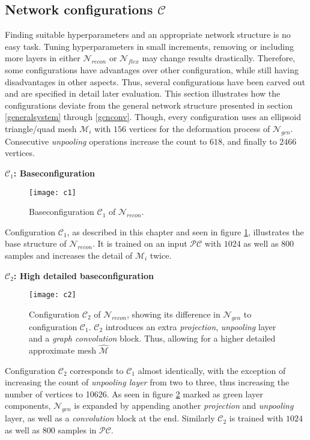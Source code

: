 \subsection{Network configurations $\mathcal{C}$}
\label{configurations}
Finding suitable hyperparameters and an appropriate network structure 
is no easy task. Tuning hyperparameters in small increments, removing or including 
more layers in either $\mathcal{N}_{recon}$ or $\mathcal{N}_{flex}$ may change results drastically.
 Therefore, some configurations have advantages over other 
configuration, while still having disadvantages in other aspects.
Thus, several configurations have been carved out and are specified 
in detail later evaluation. This section illustrates how the configurations deviate from the general
 network structure presented in section \ref{generalsystem} through \ref{gcnconv}.
Though, every configuration uses an ellipsoid triangle/quad mesh $\mathcal{M}_{i}$ with $156$ vertices for the deformation process of $\mathcal{N}_{gcn}$.
Consecutive \emph{unpooling} operations increase the count to $618$, and finally to $2466$ vertices.

\textbf{$\mathcal{C}_1$: Baseconfiguration}
\begin{figure}
   \begin{center}
   \texttt{[image: c1]}
   \caption{Baseconfiguration $\mathcal{C}_1$ of $\mathcal{N}_{recon}$.}
   \label{fig:c1}
   \end{center}
\end{figure}
Configuration $\mathcal{C}_1$, as described in this chapter and seen in figure \ref{fig:c1},
 illustrates the base structure of $\mathcal{N}_{recon}$.
It is trained on an input $\mathcal{PC}$ with $1024$ as well as $800$ samples and increases
 the detail of $\mathcal{M}_{i}$ twice. 

\textbf{$\mathcal{C}_2$: High detailed baseconfiguration}
\begin{figure}
   \begin{center}
   \texttt{[image: c2]}
   \caption{Configuration $\mathcal{C}_2$ of $\mathcal{N}_{recon}$, showing its difference in $\mathcal{N}_{gcn}$ to configuration $\mathcal{C}_1$.
   $\mathcal{C}_2$ introduces an extra \emph{projection}, \emph{unpooling} layer and a \emph{graph convolution} block. Thus, allowing for a higher detailed approximate mesh $\hat{\mathcal{M}}$ }
   \label{fig:c2}
   \end{center}
\end{figure}
Configuration $\mathcal{C}_2$ corresponds to $\mathcal{C}_1$ almost identically, 
with the exception of increasing the count of \emph{unpooling layer} from two to three, thus increasing
 the number of vertices to 10626. As seen in figure \ref{fig:c2} marked as green layer components, $\mathcal{N}_{gcn}$
  is expanded by appending another \emph{projection} and  \emph{unpooling} layer, as well
   as a \emph{convolution} block at the end. Similarly $\mathcal{C}_2$ is trained with $1024$ as well as $800$ samples
   in $\mathcal{PC}$.

